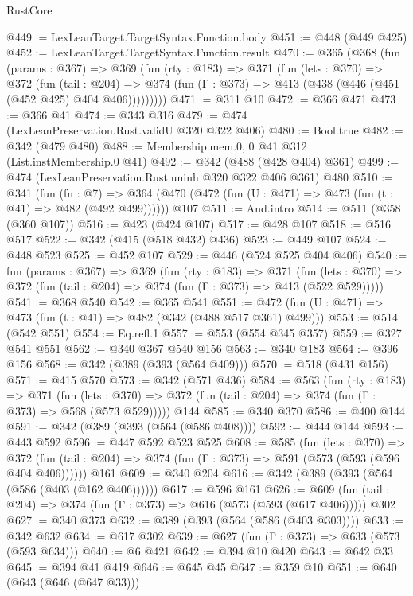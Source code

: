 \begin{lexlean}{RustCore}
\begin{coremodule}
@449 := LexLeanTarget.TargetSyntax.Function.body
@451 := @448 (@449 @425)
@452 := LexLeanTarget.TargetSyntax.Function.result
@470 := @365
    (@368
      (fun (params : @367) =>
      @369
        (fun (rty : @183) =>
        @371
          (fun (lets : @370) =>
          @372
            (fun (tail : @204) =>
            @374 (fun (Γ : @373) => @413 (@438 (@446 (@451 (@452 @425) @404 @406)))))))))
@471 := @311 @10
@472 := @366 @471
@473 := @366 @41
@474 := @343 @316
@479 := @474 (LexLeanPreservation.Rust.validU @320 @322 @406)
@480 := Bool.true
@482 := @342 (@479 @480)
@488 := Membership.mem.{0, 0} @41 @312 (List.instMembership.{0} @41)
@492 := @342 (@488 (@428 @404) @361)
@499 := @474 (LexLeanPreservation.Rust.uninh @320 @322 @406 @361) @480
@510 := @341
    (fun (fn : @7) =>
    @364 (@470 (@472 (fun (U : @471) => @473 (fun (t : @41) => @482 (@492 @499))))))
    @107
@511 := And.intro
@514 := @511 (@358 (@360 @107))
@516 := @423 (@424 @107)
@517 := @428 @107
@518 := @516 @517
@522 := @342 (@415 (@518 @432) @436)
@523 := @449 @107
@524 := @448 @523
@525 := @452 @107
@529 := @446 (@524 @525 @404 @406)
@540 := fun (params : @367) =>
  @369
    (fun (rty : @183) =>
    @371
      (fun (lets : @370) => @372 (fun (tail : @204) => @374 (fun (Γ : @373) => @413 (@522 @529)))))
@541 := @368 @540
@542 := @365 @541
@551 := @472 (fun (U : @471) => @473 (fun (t : @41) => @482 (@342 (@488 @517 @361) @499)))
@553 := @514 (@542 @551)
@554 := Eq.refl.{1}
@557 := @553 (@554 @345 @357)
@559 := @327 @541 @551
@562 := @340 @367 @540 @156
@563 := @340 @183
@564 := @396 @156
@568 := @342 (@389 (@393 (@564 @409)))
@570 := @518 (@431 @156)
@571 := @415 @570
@573 := @342 (@571 @436)
@584 := @563
    (fun (rty : @183) =>
    @371
      (fun (lets : @370) => @372 (fun (tail : @204) => @374 (fun (Γ : @373) => @568 (@573 @529)))))
    @144
@585 := @340 @370
@586 := @400 @144
@591 := @342 (@389 (@393 (@564 (@586 @408))))
@592 := @444 @144
@593 := @443 @592
@596 := @447 @592 @523 @525
@608 := @585
    (fun (lets : @370) =>
    @372 (fun (tail : @204) => @374 (fun (Γ : @373) => @591 (@573 (@593 (@596 @404 @406))))))
    @161
@609 := @340 @204
@616 := @342 (@389 (@393 (@564 (@586 (@403 (@162 @406))))))
@617 := @596 @161
@626 := @609 (fun (tail : @204) => @374 (fun (Γ : @373) => @616 (@573 (@593 (@617 @406))))) @302
@627 := @340 @373
@632 := @389 (@393 (@564 (@586 (@403 @303))))
@633 := @342 @632
@634 := @617 @302
@639 := @627 (fun (Γ : @373) => @633 (@573 (@593 @634)))
@640 := @6 @421
@642 := @394 @10 @420
@643 := @642 @33
@645 := @394 @41 @419
@646 := @645 @45
@647 := @359 @10
@651 := @640 (@643 (@646 (@647 @33)))

\end{coremodule}
\end{lexlean}
